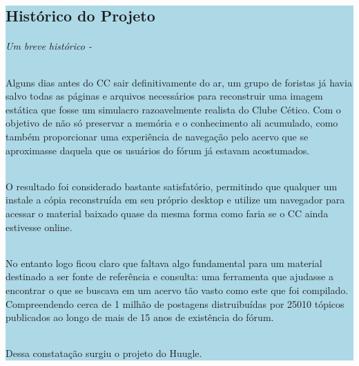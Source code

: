 \documentclass[a4paper,12pt,openany]{book}
\begin{document}
%
\colorbox{lightblue}
{
	
\begin{minipage}{18cm}
	
\part*{Histórico do Projeto}


\paragraph{Um breve histórico -}
Alguns dias antes do CC sair definitivamente do ar, um grupo de foristas
já havia salvo todas as páginas e arquivos necessários para reconstruir uma imagem estática que fosse um simulacro razoavelmente realista do Clube Cético. Com o objetivo de não só preservar a memória e o conhecimento ali acumulado, como também proporcionar uma experiência de navegação pelo acervo que se aproximasse daquela que os usuários do fórum já estavam acostumados.

\paragraph{}
O resultado foi considerado bastante satisfatório, permitindo que qualquer um instale a cópia reconstruída em seu próprio desktop e utilize um navegador para acessar o material baixado quase da mesma forma como faria se o CC ainda estivesse online.

\paragraph{}
No entanto logo ficou claro que faltava algo fundamental para um material destinado a ser fonte de referência e consulta: uma ferramenta que ajudasse a encontrar o que se buscava em um acervo tão vasto como este que foi compilado. Compreendendo cerca de 1 milhão de postagens distruibuídas por 25010 tópicos publicados ao longo de mais de 15 anos de existência do fórum.

\paragraph{}
Dessa constatação surgiu o projeto do Huugle.


\end{minipage}}
\end{document}
